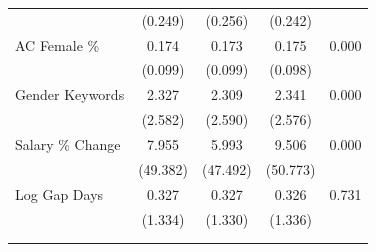 \begin{tabular}{lcccc}
                    &     (0.249)&     (0.256)&     (0.242)&            \\
AC Female \%       &       0.174&       0.173&       0.175&       0.000\\
                    &     (0.099)&     (0.099)&     (0.098)&            \\
Gender Keywords &       2.327&       2.309&       2.341&       0.000\\
                    &     (2.582)&     (2.590)&     (2.576)&            \\
Salary \% Change   &       7.955&       5.993&       9.506&       0.000\\
                    &    (49.382)&    (47.492)&    (50.773)&            \\
Log Gap Days             &       0.327&       0.327&       0.326&       0.731\\
                    &     (1.334)&     (1.330)&     (1.336)&            \\
\\[-1.8ex]\hline \hline \\[-1.8ex] \end{tabular}